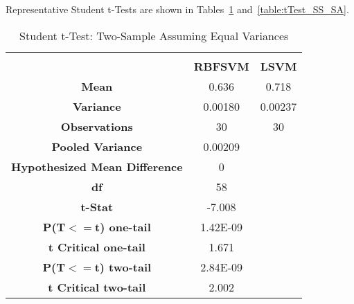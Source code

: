 \documentclass[conference]{IEEEtran}
\begin{document}
Representative Student t-Tests are shown in Tables~\ref{table:tTest_RS_SS} and~\ref{table:tTest_SS_SA}.


\begin{table}[ht]
\caption{Student t-Test: Two-Sample Assuming Equal Variances}
\def\arraystretch{1.1}
\begin{center}
\begin{tabular}{|c|cc|}
\hline
\textbf{}&\textbf{}&\textbf{} \\
\textbf{} & \textbf{RBFSVM} & \textbf{LSVM} \\
\hline
\textbf{Mean} & 0.636 & 0.718 \\
\hline
\textbf{Variance} & 0.00180 & 0.00237 \\
\hline
\textbf{Observations} & 30 & 30 \\
\hline
\textbf{Pooled Variance} & 0.00209 & \\
\hline
\textbf{Hypothesized Mean Difference} & 0 & \\
\hline
\textbf{df} & 58 & \\
\hline
\textbf{t-Stat} & -7.008 & \\
\hline
\textbf{P(T\begin{math}{<=}\end{math}t) one-tail} & 1.42E-09 & \\
\hline
\textbf{t Critical one-tail} & 1.671 & \\
\hline
\textbf{P(T\begin{math}{<=}\end{math}t) two-tail} & 2.84E-09 & \\
\hline
\textbf{t Critical two-tail} & 2.002 & \\
\hline
\end{tabular}
\label{table:tTest_RS_SS}
\end{center}
\end{table}
\end{document}
